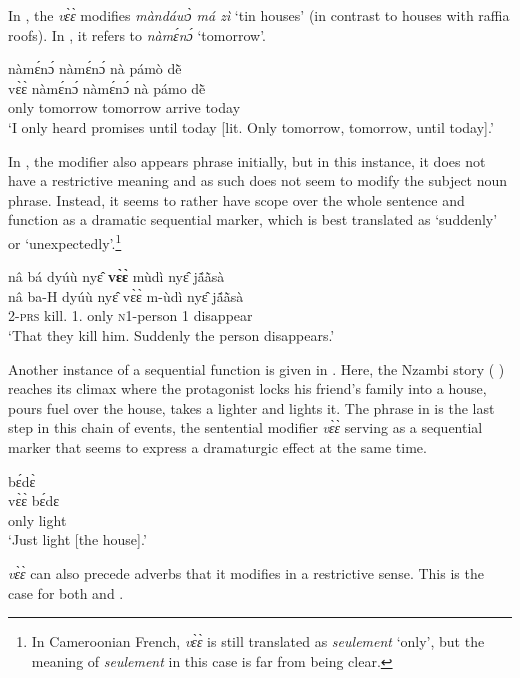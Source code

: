 In , the {\itshape vɛ̀ɛ̀} modifies {\itshape màndáwɔ̀ má zì} `tin houses' (in contrast to houses with raffia roofs). In , it refers to {\itshape nàmɛ́nɔ́} `tomorrow'.

\ea \label{vee2}
   nàmɛ́nɔ́ nàmɛ́nɔ́ nà pámò dẽ̀ \\
       vɛ̀ɛ̀ nàmɛ́nɔ́ nàmɛ́nɔ́ nà pámo dẽ̀ \\
            only tomorrow tomorrow {\COM} arrive today\\
    \trans `I only heard promises until today [lit. Only tomorrow, tomorrow, until today].'
\z

In , the modifier also appears phrase initially, but in this instance, it does not have a restrictive meaning and as such does not seem to modify the subject noun phrase. Instead, it seems to rather have scope over the whole sentence and function as a dramatic sequential marker, which is best translated as `suddenly' or `unexpectedly'.\footnote{In Cameroonian French, {\itshape vɛ̀ɛ̀} is still translated as {\itshape seulement} `only', but the meaning of {\itshape seulement} in this case is far from being clear.}

\ea \label{vee3}
  \glll   nâ bá dyúù nyɛ̂ {\bfseries vɛ̀ɛ̀} mùdì nyɛ̂ jã́ã̀sà \\
           nâ ba-H dyúù nyɛ̂ vɛ̀ɛ̀ m-ùdì nyɛ̂ jã́ã̀sà      \\
         {\COMP} 2-\textsc{prs} kill.{\SBJV} 1.{\OBJ} only \textsc{n}1-person 1 disappear\\
    \trans `That they kill him. Suddenly the person disappears.'
\z

Another instance of a sequential function is given in . Here, the Nzambi story (%
) reaches its climax where the protagonist locks his friend's family into a house, pours fuel over the house, takes a lighter and lights it. The phrase in  is the last step in this chain of events, the sentential modifier {\itshape vɛ̀ɛ̀} serving as a sequential marker that seems to express a dramaturgic effect at the same time.

\ea \label{vee4}
   bɛ́dɛ̀ \\
       vɛ̀ɛ̀ bɛ́dɛ \\
       only light\\
    \trans `Just light [the house].'
\z


{\itshape vɛ̀ɛ̀} can also precede adverbs that it modifies in a restrictive sense. This is the case for both  and .


